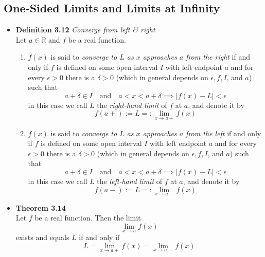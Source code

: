 \documentclass[11pt,a4paper]{article}
\begin{document}
\subsection{One-Sided Limits and Limits at Infinity}

\begin{itemize}
    \item \textbf{Definition 3.12} \emph{Converge from left \& right} \\
        Let $a \in \mathbb{R}$ and $f$ be a real function.
        \begin{enumerate}
            \item $f(x)$ is said to \emph{converge to $L$ as $x$ approaches $a$ from the right}
                if and only if $f$ is defined on some open interval $I$ with left endpoint $a$
                and for every $\epsilon > 0$ there is a $\delta > 0$
                (which in general depends on $\epsilon, f, I$, and $a$) such that
                \[
                    a + \delta \in I \quad \text{and} \quad a < x < a + \delta \implies
                    |f(x) - L| < \epsilon
                \]
                in this case we call $L$ the \emph{right-hand limit} of $f$ at $a$,
                and denote it by
                \[
                    f(a+) := L =: \lim_{x \to a+} f(x)
                \]
            \item $f(x)$ is said to \emph{converge to $L$ as $x$ approaches $a$ from the left}
                if and only if $f$ is defined on some open interval $I$ with left endpoint $a$
                and for every $\epsilon > 0$ there is a $\delta > 0$
                (which in general depends on $\epsilon, f, I$, and $a$) such that
                \[
                    a + \delta \in I \quad \text{and} \quad a < x < a + \delta \implies
                    |f(x) - L| < \epsilon
                \]
                in this case we call $L$ the \emph{left-hand limit} of $f$ at $a$,
                and denote it by
                \[
                    f(a-) := L =: \lim_{x \to a-} f(x)
                \]
        \end{enumerate}

    \item \textbf{Theorem 3.14} \\
        Let $f$ be a real function.
        Then the limit
        \[
            \lim_{x \to a} f(x)
        \]
        exists and equals $L$ if and only if
        \[
            L = \lim_{x \to a+} f(x) = \lim_{x \to a-} f(x)
        \]


\end{itemize}
\end{document}
